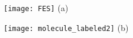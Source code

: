 \documentclass[]{article}
\begin{document}
\centering
\begin{minipage}{0.6\textwidth}
 
    
\centering
   \texttt{[image: FES]}
(a)
\end{minipage}
\begin{minipage}{0.3\textwidth}
\centering
\texttt{[image: molecule\_labeled2]}
(b)
\end{minipage}
\end{document}
